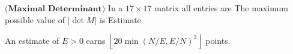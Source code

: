 $\textbf{(Maximal Determinant)}$ In a $17 \times 17$ matrix  all entries are 
The maximum possible value of $\left| \det M \right|$ is  Estimate 

An estimate of $E > 0$ earns $\left\lfloor 20\min(N/E, E/N)^2 \right\rfloor$ points.